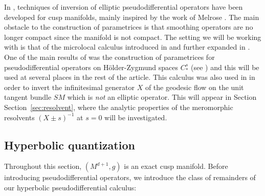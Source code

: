 \documentclass[10pt]{amsart}
\theoremstyle{plain}
\theoremstyle{definition}
\begin{document}
In \cite{Bonthonneau-Lefeuvre-19-1}, techniques of inversion of elliptic pseudodifferential operators have been developed for cusp manifolds, mainly inspired by the work of Melrose \cite{Melrose-APS-93}. The main obstacle to the construction of parametrices is that smoothing operators are no longer compact since the manifold is not compact. The setting we will be working with is that of the microlocal calculus introduced in \cite{Bonthonneau-16} and further expanded in \cite{Bonthonneau-Weich-17}. One of the main results of \cite{Bonthonneau-Lefeuvre-19-1} was the construction of parametrices for pseudodifferential operators on Hölder-Zygmund spaces $C^s_*$ (see \cite[\S 3]{Bonthonneau-Lefeuvre-19-1}) and this will be used at several places in the rest of the article. This calculus was also used in \cite{Bonthonneau-Weich-17} in order to invert the infinitesimal generator $X$ of the geodesic flow on the unit tangent bundle $SM$ which is \emph{not} an elliptic operator. This will appear in Section Section~\ref{sec:resolvent}, where the analytic properties of the meromorphic resolvents $(X\pm s)^{-1}$ at $s=0$ will be investigated.

\subsection{Hyperbolic quantization}

\label{ssection:hq}
Throughout this section, $(M^{d+1},g)$ is an exact cusp manifold. Before introducing pseudodifferential operators, we introduce the class of remainders of our hyperbolic pseudodifferential calculus:
\end{document}

